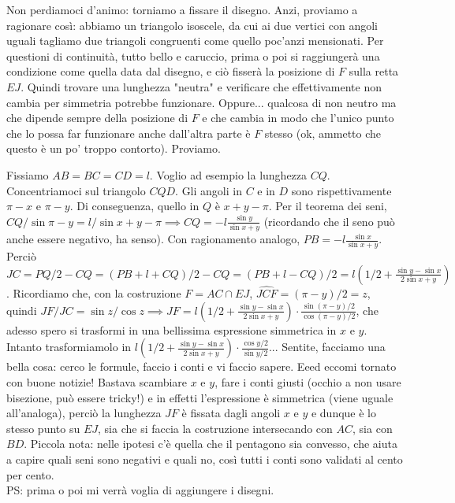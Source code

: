 \begin{sol}
  Non perdiamoci d'animo: torniamo a fissare il disegno. Anzi, proviamo a ragionare così: abbiamo un triangolo isoscele, da cui ai due vertici con angoli uguali tagliamo due triangoli congruenti come quello poc'anzi mensionati. Per questioni di continuità, tutto bello e caruccio, prima o poi si raggiungerà una condizione come quella data dal disegno, e ciò fisserà la posizione di $F$ sulla retta $EJ$. Quindi trovare una lunghezza "neutra" e verificare che effettivamente non cambia per simmetria potrebbe funzionare. Oppure... qualcosa di non neutro ma che dipende sempre della posizione di $F$ e che cambia in modo che l'unico punto che lo possa far funzionare anche dall'altra parte è $F$ stesso (ok, ammetto che questo è un po' troppo contorto). Proviamo.

  Fissiamo $AB=BC=CD=l$. Voglio ad esempio la lunghezza $CQ$. Concentriamoci sul triangolo $CQD$. Gli angoli in $C$ e in $D$ sono rispettivamente $\pi-x$ e $\pi-y$. Di conseguenza, quello in $Q$ è $x+y-\pi$. Per il teorema dei seni, $CQ/\sin{\pi-y}=l/\sin{x+y-\pi} \implies CQ=-l\frac{\sin{y}}{\sin{x+y}}$ (ricordando che il seno può anche essere negativo, ha senso). Con ragionamento analogo, $PB=-l\frac{\sin{x}}{\sin{x+y}}$.
  Perciò $JC=PQ/2-CQ=(PB+l+CQ)/2-CQ=(PB+l-CQ)/2=l\left(1/2+\frac{\sin{y}-\sin{x}}{2\sin{x+y}}\right)$.
  Ricordiamo che, con la costruzione $F=AC \cap EJ$, $\widehat{JCF}=(\pi-y)/2=z$, quindi $JF/JC=\sin{z}/\cos{z} \implies JF=l\left(1/2+\frac{\sin{y}-\sin{x}}{2\sin{x+y}}\right) \cdot \frac{\sin{(\pi-y)/2}}{\cos{(\pi-y)/2}}$, che adesso spero si trasformi in una bellissima espressione simmetrica in $x$ e $y$.
  Intanto trasformiamolo in $l\left(1/2+\frac{\sin{y}-\sin{x}}{2\sin{x+y}}\right) \cdot \frac{\cos{y/2}}{\sin{y/2}}$... Sentite, facciamo una bella cosa: cerco le formule, faccio i conti e vi faccio sapere. Eeed eccomi tornato con buone notizie! Bastava scambiare $x$ e $y$, fare i conti giusti (occhio a non usare bisezione, può essere tricky!) e in effetti l'espressione è simmetrica (viene uguale all'analoga), perciò la lunghezza $JF$ è fissata dagli angoli $x$ e $y$ e dunque è lo stesso punto su $EJ$, sia che si faccia la costruzione intersecando con $AC$, sia con $BD$. Piccola nota: nelle ipotesi c'è quella che il pentagono sia convesso, che aiuta a capire quali seni sono negativi e quali no, così tutti i conti sono validati al cento per cento. \\

  PS: prima o poi mi verrà voglia di aggiungere i disegni.
\end{sol}
